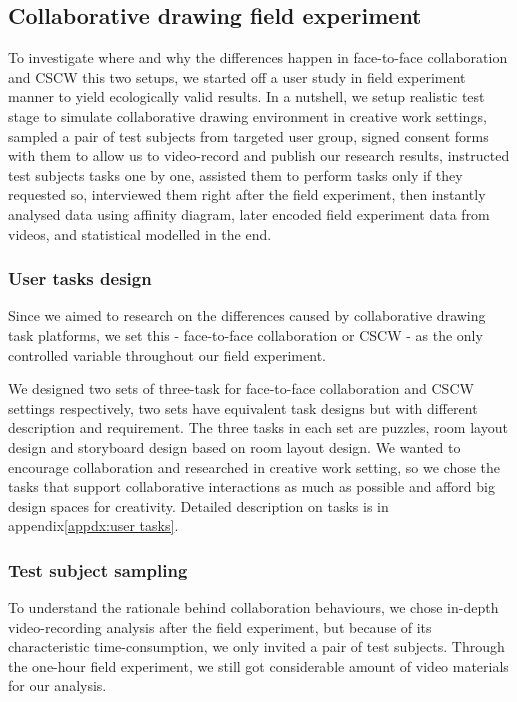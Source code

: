 \documentclass[12pt,twoside]{article}
\begin{document}
\subsection{Collaborative drawing field experiment}
\label{sect:collaborative}
To investigate where and why the differences happen in face-to-face collaboration and CSCW this two setups, we started off a user study in field experiment manner to yield ecologically valid results. In a nutshell, we setup realistic test stage to simulate collaborative drawing environment in creative work settings, sampled a pair of test subjects from targeted user group, signed consent forms with them to allow us to video-record and publish our research results, instructed test subjects tasks one by one, assisted them to perform tasks only if they requested so, interviewed them right after the field experiment, then instantly analysed data using affinity diagram, later encoded field experiment data from videos, and statistical modelled in the end.

\subsubsection{User tasks design}

Since we aimed to research on the differences caused by collaborative drawing task platforms, we set this - face-to-face collaboration or CSCW - as the only controlled variable throughout our field experiment. 

We designed two sets of three-task for face-to-face collaboration and CSCW settings respectively, two sets have equivalent task designs but with different description and requirement. The three tasks in each set are puzzles, room layout design and storyboard design based on room layout design. We wanted to encourage collaboration and researched in creative work setting, so we chose the tasks that support collaborative interactions as much as possible and afford big design spaces for creativity. Detailed description on tasks is in appendix\ref{appdx:user tasks}. 

\subsubsection{Test subject sampling}

To understand the rationale behind collaboration behaviours, we chose in-depth video-recording analysis after the field experiment, but because of its characteristic time-consumption, we only invited a pair of test subjects. Through the one-hour field experiment, we still got considerable amount of video materials for our analysis.
\end{document}
